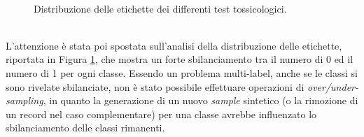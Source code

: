 \begin{figure}[!ht]
	\quad
	\\
	\quad
	\quad	{}\quad
	\caption{Distribuzione delle etichette dei differenti test tossicologici.}
	\label{fig:class_distribution}
\end{figure}
\\L'attenzione è stata poi spostata sull'analisi della distribuzione delle etichette, riportata in Figura \ref{fig:class_distribution}, che mostra un forte sbilanciamento tra il numero di 0 ed il numero di 1 per ogni classe. 
Essendo un problema multi-label, anche se le classi si sono rivelate sbilanciate, non è stato possibile effettuare operazioni di \textit{over/under-sampling}, in quanto la generazione di un nuovo \textit{sample} sintetico (o la rimozione di un record nel caso complementare) per una classe avrebbe influenzato lo sbilanciamento delle classi rimanenti.
